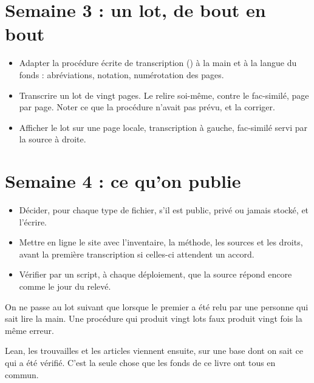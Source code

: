 \section{Semaine 3 : un lot, de bout en bout}

\begin{itemize}
  \item Adapter la procédure écrite de transcription () à la main et à la
        langue du fonds : abréviations, notation, numérotation des pages.
  \item Transcrire un lot de vingt pages. Le relire soi-même, contre le fac-similé, page
        par page. Noter ce que la procédure n'avait pas prévu, et la corriger.
  \item Afficher le lot sur une page locale, transcription à gauche, fac-similé servi par
        la source à droite.
\end{itemize}

\section{Semaine 4 : ce qu'on publie}

\begin{itemize}
  \item Décider, pour chaque type de fichier, s'il est public, privé ou jamais stocké, et
        l'écrire.
  \item Mettre en ligne le site avec l'inventaire, la méthode, les sources et les droits,
        avant la première transcription si celles-ci attendent un accord.
  \item Vérifier par un script, à chaque déploiement, que la source répond encore comme le
        jour du relevé.
\end{itemize}

\begin{regle}
On ne passe au lot suivant que lorsque le premier a été relu par une personne qui sait lire
la main. Une procédure qui produit vingt lots faux produit vingt fois la même erreur.
\end{regle}

Lean, les trouvailles et les articles viennent ensuite, sur une base dont on sait ce qui a
été vérifié. C'est la seule chose que les fonds de ce livre ont tous en commun.
